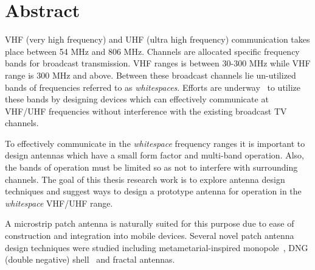 

\chapter*{Abstract}
VHF (very high frequency) and UHF (ultra high frequency) communication takes place
between 54 MHz and 806 MHz. Channels are allocated specific frequency bands for
broadcast transmission. VHF ranges is between 30-300 MHz while VHF range is 300 MHz
and above. Between these broadcast channels lie un-utilized bands of frequencies
referred to as {\em whitespaces}. Efforts are underway~\cite{FCCTest} to utilize these
bands by designing devices which can effectively communicate at VHF/UHF frequencies
without interference with the existing broadcast TV channels.

To effectively communicate in the {\em whitespace} frequency ranges it is important
to design antennas which have a small form factor and multi-band operation. Also, the
bands of operation must be limited so as not to interfere with surrounding channels.
The goal of this thesis research work is to explore antenna design techniques and
suggest ways to design a prototype antenna for operation in the \emph{whitespace}
VHF/UHF range.

A microstrip patch antenna is naturally suited for this purpose due to ease of construction
and integration into mobile devices. Several novel patch antenna design techniques were studied
including metametarial-inspired monopole~\cite{tribandMM}, DNG (double negative) shell~\cite{DNGShell}
and fractal antennas.